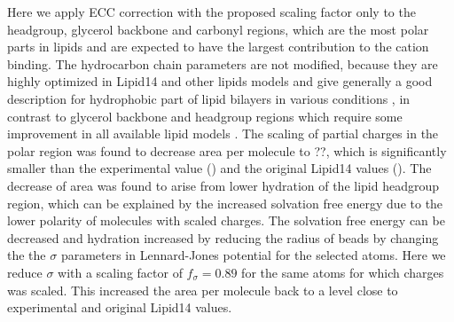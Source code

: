 \documentclass[aip,jcp,twocolumn]{revtex4}
\begin{document}
Here we apply ECC correction with the proposed scaling factor only to the headgroup,
glycerol backbone and carbonyl regions, which are the most polar parts in lipids and
are expected to have the largest contribution to the cation binding.
The hydrocarbon chain parameters are not modified, because they are
highly optimized in Lipid14 and other lipids models and
give generally a good description for hydrophobic part of lipid bilayers
in various conditions \cite{ollila16},
in contrast to glycerol backbone and headgroup regions which require
some improvement in all available lipid models \cite{botan15}. 
The scaling of partial charges in the polar region was found to decrease
area per molecule to ??, which is significantly smaller than the
experimental value (\cite{}) and the original Lipid14 values (\cite{}).  
The decrease of area was found to arise from lower hydration of the lipid headgroup region,
which can be explained by the increased solvation free energy due to the lower polarity
of molecules with scaled charges. The solvation free energy can be decreased
and hydration increased by reducing the radius of beads by changing the 
the $\sigma$ parameters in Lennard-Jones potential for the selected atoms.
Here we reduce $\sigma$ with a scaling factor of $f_\sigma = 0.89$ for the same atoms for which
charges was scaled. This increased the area per molecule back
to a level close to experimental and original Lipid14 values. 
\end{document}
